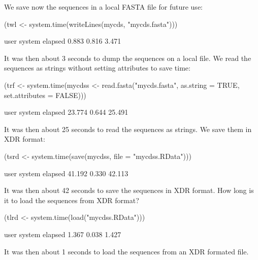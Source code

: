 \documentclass{article}
\begin{document}
We save now the sequences in a local FASTA file for future use:

\begin{Schunk}
\begin{Sinput}
 (twl <- system.time(writeLines(mycds, "mycds.fasta")))
\end{Sinput}
\begin{Soutput}
   user  system elapsed 
  0.883   0.816   3.471 
\end{Soutput}
\end{Schunk}

It was then about 3 seconds
to dump the sequences on a local file. We read the sequences as strings
without setting attributes to save time:

\begin{Schunk}
\begin{Sinput}
 (trf <- system.time(mycdss <- read.fasta("mycds.fasta", as.string = TRUE, 
     set.attributes = FALSE)))
\end{Sinput}
\begin{Soutput}
   user  system elapsed 
 23.774   0.644  25.491 
\end{Soutput}
\end{Schunk}

It was then about 25 seconds
to read the sequences as strings. We save them in XDR format:

\begin{Schunk}
\begin{Sinput}
 (tsrd <- system.time(save(mycdss, file = "mycdss.RData")))
\end{Sinput}
\begin{Soutput}
   user  system elapsed 
 41.192   0.330  42.113 
\end{Soutput}
\end{Schunk}

It was then about 42 seconds
to save the sequences in XDR format. How long is it to load the sequences
from XDR format?

\begin{Schunk}
\begin{Sinput}
 (tlrd <- system.time(load("mycdss.RData")))
\end{Sinput}
\begin{Soutput}
   user  system elapsed 
  1.367   0.038   1.427 
\end{Soutput}
\end{Schunk}

It was then about 1 seconds
to load the sequences from an XDR formated file. 
\end{document}
